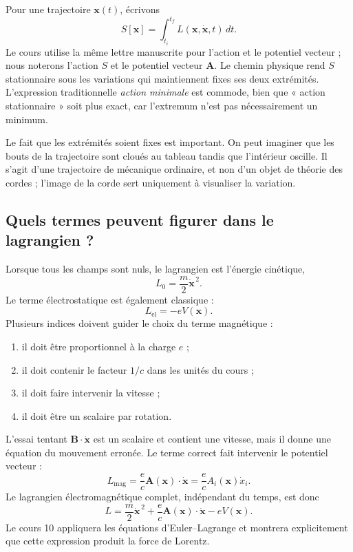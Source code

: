 Pour une trajectoire \(\mathbf x(t)\), écrivons
\begin{equation}
  S[\mathbf x]
  =
  \int_{t_i}^{t_f}L(\mathbf x,\dot{\mathbf x},t)\,dt.
\end{equation}
Le cours utilise la même lettre manuscrite pour l’action et le potentiel vecteur ; nous noterons l’action \(S\) et le potentiel vecteur \(\mathbf A\). Le chemin physique rend \(S\) stationnaire sous les variations qui maintiennent fixes ses deux extrémités. L’expression traditionnelle \emph{action minimale} est commode, bien que « action stationnaire » soit plus exact, car l’extremum n’est pas nécessairement un minimum.

Le fait que les extrémités soient fixes est important. On peut imaginer que les bouts de la trajectoire sont cloués au tableau tandis que l’intérieur oscille. Il s’agit d’une trajectoire de mécanique ordinaire, et non d’un objet de théorie des cordes ; l’image de la corde sert uniquement à visualiser la variation.

\subsection{Quels termes peuvent figurer dans le lagrangien ?}

Lorsque tous les champs sont nuls, le lagrangien est l’énergie cinétique,
\begin{equation}
  L_0=\frac{m}{2}\dot{\mathbf x}^{\,2}.
\end{equation}
Le terme électrostatique est également classique :
\begin{equation}
  L_{\mathrm{el}}=-eV(\mathbf x).
\end{equation}
Plusieurs indices doivent guider le choix du terme magnétique :
\begin{enumerate}
  \item il doit être proportionnel à la charge \(e\) ;
  \item il doit contenir le facteur \(1/c\) dans les unités du cours ;
  \item il doit faire intervenir la vitesse ;
  \item il doit être un scalaire par rotation.
\end{enumerate}

L’essai tentant \(\mathbf B\cdot\dot{\mathbf x}\) est un scalaire et contient une vitesse, mais il donne une équation du mouvement erronée. Le terme correct fait intervenir le potentiel vecteur :
\begin{equation}
  L_{\mathrm{mag}}
  =
  \frac{e}{c}\mathbf A(\mathbf x)\cdot\dot{\mathbf x}
  =
  \frac{e}{c}A_i(\mathbf x)\dot x_i.
\end{equation}
Le lagrangien électromagnétique complet, indépendant du temps, est donc
\begin{equation}
  \boxed{
  L
  =
  \frac{m}{2}\dot{\mathbf x}^{\,2}
  +\frac{e}{c}\mathbf A(\mathbf x)\cdot\dot{\mathbf x}
  -eV(\mathbf x)
  }.
\end{equation}
Le cours 10 appliquera les équations d’Euler--Lagrange et montrera explicitement que cette expression produit la force de Lorentz.

